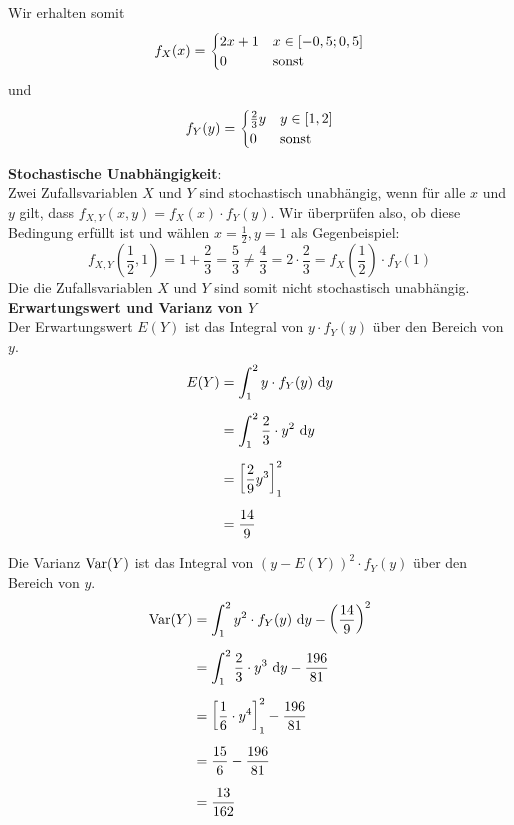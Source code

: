 \documentclass[main.tex]{subfiles}
\begin{document}
Wir erhalten somit $$
f_X(x) = \begin{cases}
	2x + 1 & x\in [-0,5; 0,5] \\
	0 & \text{sonst}
\end{cases}$$
und $$
f_Y(y) = \begin{cases}
	\frac{2}{3}y & y\in [1, 2] \\
	0 & \text{sonst}
\end{cases}
$$

\textbf{Stochastische Unabhängigkeit}:\\

Zwei Zufallsvariablen \(X\) und \(Y\) sind stochastisch unabhängig, wenn für alle \(x\) und \(y\) gilt, dass \(f_{X,Y}(x,y) = f_X(x) \cdot f_Y(y)\).
Wir überprüfen also, ob diese Bedingung erfüllt ist und wählen $x=\frac{1}{2}, y=1$ als Gegenbeispiel:
$$
	f_{X,Y}\left(\frac{1}{2}, 1\right) = 1 + \frac{2}{3} = \frac{5}{3} \neq \frac{4}{3} = 2\cdot \frac{2}{3} = f_X\left(\frac{1}{2}\right) \cdot f_Y(1)
$$
Die die Zufallsvariablen $X$ und $Y$ sind somit nicht stochastisch unabhängig.\\


\textbf{Erwartungswert und Varianz von \(Y\)}\\
Der Erwartungswert \(E(Y)\) ist das Integral von \(y \cdot f_Y(y)\) über den Bereich von \(y\).
$$\begin{aligned}
	E(Y) &= \int_{1}^{2} y\cdot f_Y(y) ~\mathrm{d}y \\[2mm]
	&=\int_{1}^{2} \frac{2}{3}\cdot y^2 ~\mathrm{d}y \\[2mm]
	&=\left[ \frac{2}{9} y^3 \right]_{1}^{2} \\[2mm]
	&= \frac{14}{9} \\
\end{aligned}$$

Die Varianz \(\operatorname{Var}(Y)\) ist das Integral von \((y - E(Y))^2 \cdot f_Y(y)\) über den Bereich von \(y\).
$$\begin{aligned}
	\operatorname{Var}(Y) &= \int_{1}^{2} y^2\cdot f_Y(y) ~\mathrm{d}y - \left(\frac{14}{9}\right)^2\\[2mm]
	&= \int_{1}^{2} \frac{2}{3}\cdot y^3 ~\mathrm{d}y - \frac{196}{81}\\[2mm]
	&= \left[ \frac{1}{6}\cdot y^4 \right]_{1}^{2} - \frac{196}{81}\\[2mm]
	&= \frac{15}{6} - \frac{196}{81}\\[2mm]
	&= \frac{13}{162}
\end{aligned}$$
\end{document}
